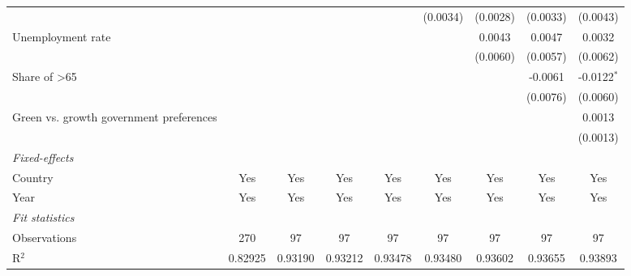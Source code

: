 \begin{table}[htbp]
\begin{tabular}{lcccccccc}
                                                             &          &                &                &                 & (0.0034)        & (0.0028)       & (0.0033)        & (0.0043)\\   
      Unemployment rate                                      &          &                &                &                 &                 & 0.0043         & 0.0047          & 0.0032\\   
                                                             &          &                &                &                 &                 & (0.0060)       & (0.0057)        & (0.0062)\\   
      Share of >65                                           &          &                &                &                 &                 &                & -0.0061         & -0.0122$^{*}$\\   
                                                             &          &                &                &                 &                 &                & (0.0076)        & (0.0060)\\   
      Green vs. growth government preferences                &          &                &                &                 &                 &                &                 & 0.0013\\   
                                                             &          &                &                &                 &                 &                &                 & (0.0013)\\   
      \midrule
      \emph{Fixed-effects}\\
      Country                                                & Yes      & Yes            & Yes            & Yes             & Yes             & Yes            & Yes             & Yes\\  
      Year                                                   & Yes      & Yes            & Yes            & Yes             & Yes             & Yes            & Yes             & Yes\\  
      \midrule
      \emph{Fit statistics}\\
      Observations                                           & 270      & 97             & 97             & 97              & 97              & 97             & 97              & 97\\  
      R$^2$                                                  & 0.82925  & 0.93190        & 0.93212        & 0.93478         & 0.93480         & 0.93602        & 0.93655         & 0.93893\\  

\end{tabular}
\end{table}
